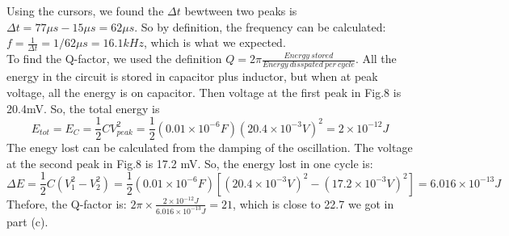 \documentclass[]{article}
\begin{document}
	Using the cursors, we found the $\Delta t $ bewtween two peaks is $\Delta t= 77\mu s-15\mu s=62\mu s$. So by definition, the frequency can be calculated: $f=\frac{1}{\Delta t}=1/62\mu s=16.1 kHz$, which is what we expected.\\
	To find the Q-factor, we used the definition $Q=2\pi \frac{Energy \ stored}{Energy \ disspated \ per \ cycle}$. All the energy in the circuit is stored in capacitor plus inductor, but when at peak voltage, all the energy is on capacitor. Then voltage at the first peak in Fig.8 is 20.4mV.  So, the total energy is
	\[  E_{tot}=E_{C}=\frac{1}{2} CV_{peak}^{2}=\frac{1}{2} (0.01\times 10^{-6}F) (20.4\times 10^{-3}V)^{2}= 2\times 10^{-12}J \]
	The enegy lost can be calculated from the damping of the oscillation. The voltage at the second peak in Fig.8 is 17.2 mV. So, the energy lost in one cycle is:
	\[\Delta E=  \frac{1}{2} C(V_{1}^{2}-V_{2}^{2}) =\frac{1}{2}(0.01\times 10^{-6}F)[(20.4 \times 10^{-3}V)^{2}-(17.2 \times 10^{-3}V)^{2}]=6.016\times 10^{-13}J \]
	Thefore, the Q-factor is: $2\pi \times \frac{2\times 10^{-12}J}{6.016\times 10^{-13}J}=21$, which is close to 22.7 we got in part (c).\\
\end{document}

